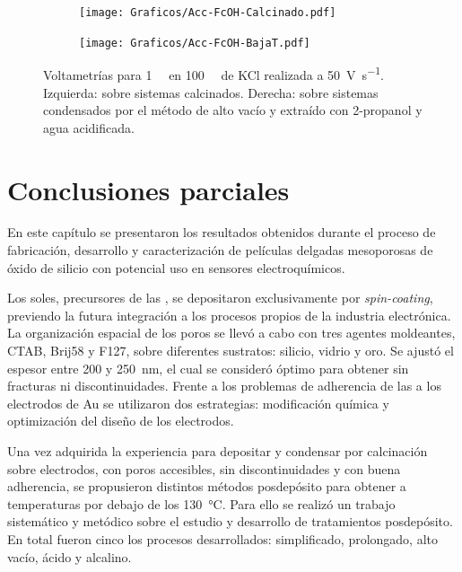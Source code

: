       		\begin{figure}[ht!]
		 	\begin{subfigure}[t]{0.5\textwidth}
		          	\texttt{[image: Graficos/Acc-FcOH-Calcinado.pdf]}
		          	\end{subfigure}
		    \begin{subfigure}[t]{0.5\textwidth}
		          	\texttt{[image: Graficos/Acc-FcOH-BajaT.pdf]}
		         	\end{subfigure}
		         	\caption[Voltagrama comparativo SF calcinados/alto vacío II]{Voltametrías para \fc\space \SI{1}{\milli\Molar} en \SI{100}{\milli\Molar} de KCl realizada a \SI{50}{\volt\per\second}. Izquierda: sobre sistemas \pdmF\space calcinados. Derecha: sobre sistemas \pdmF\space condensados por el método de alto vacío y extraído con 2-propanol y agua acidificada.}
		         	\label{fig:fcOH_accesibilidad}
		    \end{figure}     	

\section{Conclusiones parciales}
	
	En este capítulo se presentaron los resultados obtenidos durante el proceso de fabricación, desarrollo y caracterización de películas delgadas mesoporosas de óxido de silicio con potencial uso en sensores electroquímicos.
	
	Los soles, precursores de las \pdm, se depositaron exclusivamente por \textit{spin-coating}, previendo la futura integración a los procesos propios de la industria electrónica. La organización espacial de los poros se llevó a cabo con tres agentes moldeantes, CTAB, Brij58 y F127, sobre diferentes sustratos: silicio, vidrio y oro. Se ajustó el espesor entre 200 y \SI{250}{\nm}, el cual se consideró óptimo para obtener \pdm\space sin fracturas ni discontinuidades. Frente a los problemas de adherencia de las \pdm\space a los electrodos de Au se utilizaron dos estrategias: modificación química y optimización del diseño de los electrodos. 

	Una vez adquirida la experiencia para depositar y condensar por calcinación \pdm\space sobre electrodos, con poros accesibles, sin discontinuidades y con buena adherencia, se propusieron distintos métodos posdepósito para obtener \pdm\space a temperaturas por debajo de los \SI{130}{\celsius}. Para ello se realizó un trabajo sistemático y metódico sobre el estudio y desarrollo de tratamientos posdepósito. En total fueron cinco los procesos desarrollados: simplificado, prolongado, alto vacío, ácido y alcalino.

